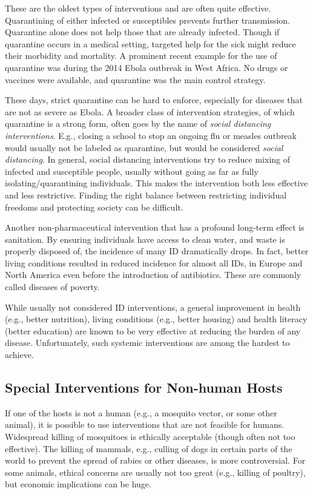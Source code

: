 \documentclass[]{book}
\theoremstyle{definition}
\theoremstyle{definition}
\theoremstyle{definition}
\theoremstyle{remark}
\begin{document}
These are the oldest types of interventions and are often quite
effective. Quarantining of either infected or susceptibles prevents
further transmission. Quarantine alone does not help those that are
already infected. Though if quarantine occurs in a medical setting,
targeted help for the sick might reduce their morbidity and mortality. A
prominent recent example for the use of quarantine was during the 2014
Ebola outbreak in West Africa. No drugs or vaccines were available, and
quarantine was the main control strategy.

These days, strict quarantine can be hard to enforce, especially for
diseases that are not as severe as Ebola. A broader class of
intervention strategies, of which quarantine is a strong form, often
goes by the name of \emph{social distancing interventions}. E.g.,
closing a school to stop an ongoing flu or measles outbreak would
usually not be labeled as quarantine, but would be considered
\emph{social distancing}. In general, social distancing interventions
try to reduce mixing of infected and susceptible people, usually without
going as far as fully isolating/quarantining individuals. This makes the
intervention both less effective and less restrictive. Finding the right
balance between restricting individual freedoms and protecting society
can be difficult.

Another non-pharmaceutical intervention that has a profound long-term
effect is sanitation. By ensuring individuals have access to clean
water, and waste is properly disposed of, the incidence of many ID
dramatically drops. In fact, better living conditions resulted in
reduced incidence for almost all IDs, in Europe and North America even
before the introduction of antibiotics. These are commonly called
diseases of poverty.

While usually not considered ID interventions, a general improvement in
health (e.g., better nutrition), living conditions (e.g., better
housing) and health literacy (better education) are known to be very
effective at reducing the burden of any disease. Unfortunately, such
systemic interventions are among the hardest to achieve.

\subsection{Special Interventions for Non-human
Hosts}\label{special-interventions-for-non-human-hosts}

If one of the hosts is not a human (e.g., a mosquito vector, or some
other animal), it is possible to use interventions that are not feasible
for humans. Widespread killing of mosquitoes is ethically acceptable
(though often not too effective). The killing of mammals, e.g., culling
of dogs in certain parts of the world to prevent the spread of rabies or
other diseases, is more controversial. For some animals, ethical
concerns are usually not too great (e.g., killing of poultry), but
economic implications can be huge.
\end{document}
